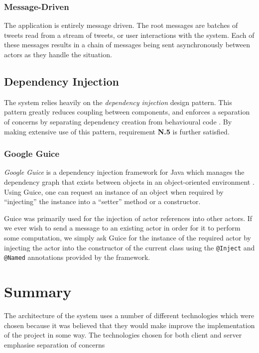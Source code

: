 \documentclass{l4proj}
\newcommand{\code}[1]{\texttt{#1}}
\begin{document}
            \subsubsection{Message-Driven}
            The application is entirely message driven. The root messages are batches of tweets read from a stream of tweets, or user interactions with the system. Each of these messages results in a chain of messages being sent asynchronously between actors as they handle the situation.       
        
        \subsection{Dependency Injection}
        
        The system relies heavily on the \textit{dependency injection} design pattern. This pattern greatly reduces coupling between components, and enforces a separation of concerns by separating dependency creation from behavioural code \cite{di}. By making extensive use of this pattern, requirement \textbf{N.5} is further satisfied.
        
            \subsubsection{Google Guice}
                
        \textit{Google Guice} is a dependency injection framework for Java which manages the dependency graph that exists between objects in an object-oriented environment \cite{guice}. Using Guice, one can request an instance of an object when required by ``injecting'' the instance into a ``setter'' method or a constructor.

Guice was primarily used for the injection of actor references into other actors. If we ever wish to send a message to an existing actor in order for it to perform some computation, we simply ask Guice for the instance of the required actor by injecting the actor into the constructor of the current class using the \code{@Inject} and \code{@Named} annotations provided by the framework.

    \section{Summary}
    The architecture of the system uses a number of different technologies which were chosen because it was believed that they would make improve the implementation of the project in some way. The technologies chosen for both client and server emphasise separation of concerns
        
\end{document}
